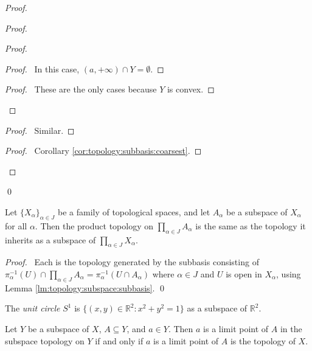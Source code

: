 \begin{proof}
\begin{proof}
\begin{proof}
\begin{proof}
        \pf\ In this case, $(a, +\infty) \cap Y = \emptyset$.
      \end{proof}
      \qedstep
      \begin{proof}
        \pf\ These are the only cases because $Y$ is convex.
      \end{proof}
    \end{proof}
    \begin{proof}
      \pf\ Similar.
    \end{proof}
    \qedstep
    \begin{proof}
      \pf\ Corollary \ref{cor:topology:subbasis:coarsest}.
    \end{proof}
  \end{proof}
  \qed
\end{proof}

\begin{thm}
  Let $\{X_\alpha\}_{\alpha \in J}$ be a family of topological spaces, and
  let $A_\alpha$ be a subspace of $X_\alpha$ for all $\alpha$. Then the
  product
  topology on $\prod_{\alpha \in J} A_\alpha$ is the same as the topology it
  inherits as a subspace of $\prod_{\alpha \in J} X_\alpha$.
\end{thm}

\begin{proof}
  \pf\ Each is the topology generated by the subbasis consisting of
  $\pi_\alpha^{-1}(U) \cap \prod_{\alpha \in J} A_\alpha = \pi_\alpha^{-1}(U
  \cap A_\alpha)$ where $\alpha \in J$ and $U$ is open in $X_\alpha$, using
  Lemma
  \ref{lm:topology:subspace:subbasis}. \qed
\end{proof}

\begin{df}
  The \emph{unit circle} $S^1$ is $\{ (x,y) \in \mathbb{R}^2 : x^2 + y^2 = 1
  \}$ as a subspace of $\mathbb{R}^2$.
\end{df}

\begin{prop}
  \label{prop:topology:subspace:limit_point}
  Let $Y$ be a subspace of $X$, $A \subseteq Y$, and $a \in Y$. Then $a$ is a
  limit point of $A$ in the subspace topology on $Y$ if and only if $a$ is a
  limit point of $A$ is the topology of $X$.
\end{prop}

